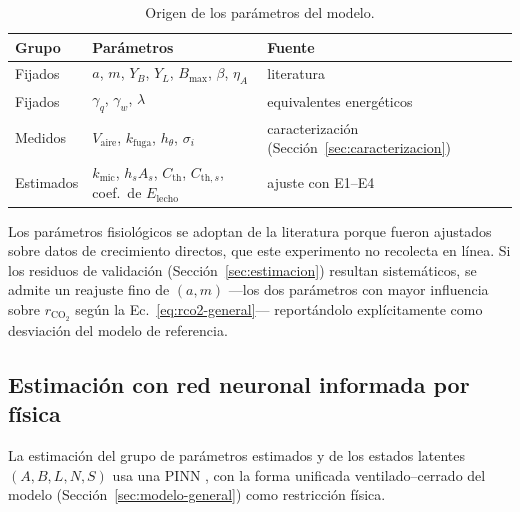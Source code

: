 \begin{table}[htbp]
  \centering
  \caption{Origen de los parámetros del modelo.}
  \label{tab:parametros}
\begin{tabularx}{\textwidth}{@{}>{\raggedright\arraybackslash}p{}>{\raggedright\arraybackslash}p{}>{\raggedright\arraybackslash}X@{}}
    Grupo & Parámetros & Fuente \\
    \hline
    Fijados & $a$, $m$, $Y_B$, $Y_L$, $B_{\max}$, $\beta$, $\eta_A$ &
    literatura \citep{eriksenDynamicModellingFeed2022,eriksenMetabolicPerformanceFeed2024} \\
    Fijados & $\gamma_q$, $\gamma_w$, $\lambda$ &
    equivalentes energéticos \citep{lightonMeasuringMetabolicRates2008,hansenUseCalorespirometricRatios2004} \\
    Medidos & $V_{\mathrm{aire}}$, $k_{\mathrm{fuga}}$, $h_\theta$, $\sigma_i$ &
    caracterización (Sección~\ref{sec:caracterizacion}) \\
    Estimados & $k_{\mathrm{mic}}$, $h_s A_s$, $C_{\mathrm{th}}$, $C_{\mathrm{th},s}$,
    coef.\ de $E_{\mathrm{lecho}}$ & ajuste con E1--E4 \\
    \hline
  \end{tabularx}
\end{table}

\begin{remark}
Los parámetros fisiológicos se adoptan de la literatura porque fueron
ajustados sobre datos de crecimiento directos, que este experimento no
recolecta en línea. Si los residuos de validación (Sección~\ref{sec:estimacion})
resultan sistemáticos, se admite un reajuste fino de $(a, m)$ ---los dos
parámetros con mayor influencia sobre $r_{\mathrm{CO_2}}$ según la
Ec.~\eqref{eq:rco2-general}--- reportándolo explícitamente como desviación
del modelo de referencia.
\end{remark}

\subsection{Estimación con red neuronal informada por física}\label{sec:pinn}

La estimación del grupo de parámetros estimados y de los estados latentes
$(A, B, L, N, S)$ usa una PINN \citep{raissiPhysicsinformedNeuralNetworks2019a},
con la forma unificada ventilado--cerrado del modelo
(Sección~\ref{sec:modelo-general}) como restricción física.

